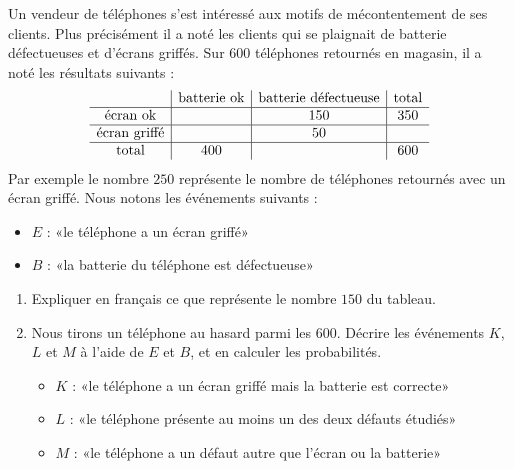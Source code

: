 
\begin{exercice}\label{exosmath-0710}

    Un vendeur de téléphones s'est intéressé aux motifs de mécontentement de ses clients. Plus précisément il a noté les clients qui se plaignait de batterie défectueuses et d'écrans griffés. Sur \( 600\) téléphones retournés en magasin, il a noté les résultats suivants :
    \begin{equation*}
        \begin{array}[]{c|c|c|c}
            &\text{batterie ok}&\text{batterie défectueuse}&\text{total}\\
            \hline
            \text{écran ok}&&150&350\\
            \hline
            \text{écran griffé}&&50&\\
            \hline
            \text{total}&400&&600\\
        \end{array}
    \end{equation*}
    Par exemple le nombre \( 250\) représente le nombre de téléphones retournés avec un écran griffé. Nous notons les événements suivants :
    \begin{itemize}
        \item $E$ : «le téléphone a un écran griffé» 
        \item $B$ : «la batterie du téléphone est défectueuse» 
    \end{itemize}
    \begin{enumerate}
        \item
            Expliquer en français ce que représente le nombre \( 150\) du tableau.
        \item
            Nous tirons un téléphone au hasard parmi les \( 600\). Décrire les événements \( K\), \( L\) et \( M\) à l'aide de \( E\) et \( B\), et en calculer les probabilités.
            \begin{itemize}
                \item \( K\) : «le téléphone a un écran griffé mais la batterie est correcte» 
                \item \( L\) : «le téléphone présente au moins un des deux défauts étudiés» 
                \item \( M\) : «le téléphone a un défaut autre que l'écran ou la batterie» 
            \end{itemize}
    \end{enumerate}

\end{exercice}
